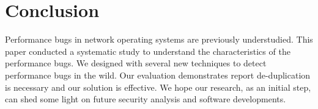 \section{Conclusion}
\label{s:conclusion}
Performance bugs in network operating systems are previously understudied.
%
This paper conducted a systematic study to understand the characteristics of the performance bugs.
We designed \sys with several new techniques to detect performance bugs in the wild.
%
Our evaluation demonstrates report de-duplication is necessary and our solution is effective.
%
We hope our research, as an initial step, can shed some light on future security analysis and software developments.
